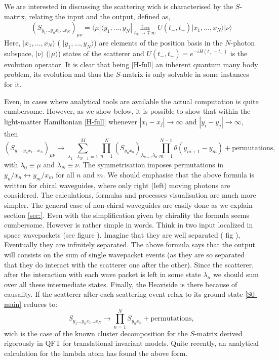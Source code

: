 \documentclass[notitlepage, prx, preprint, amsmath,superscriptaddress,amssymb]{revtex4-1}
\begin{document}
We are interested in discussing the scattering wich is characterised by the $S$-matrix, relating the input and the output, defined as,
\begin{equation}
( S_{y_1 ...y_n x_1...x_N} )_{\mu \nu} = \langle \mu | \langle y_1, ..., y_N | \lim_{t_\mp  \to \mp \infty} U(t_-, t_+) | x_1, ..., x_N \rangle | \nu \rangle
\end{equation}
Here, $|x_1, ...,x_N\rangle$ ( $|y_1, ...,y_N\rangle$)  are  elements of the position basis in the $N$-photon subspace,  $|\nu \rangle$  ($|\mu\rangle$)  states of the scatterer and $U (t_-, t_+) = e^{-i H (t_+-t_-)}$ is the evolution operator.  
It is clear that being \eqref{H-full} an inherent quantum many body problem, its evolution and thus the $S$-matrix is only solvable in some instances for it.  

Even, in cases where analytical tools are available the actual computation is quite cumbersome.  However, as we show below, it is possible to show that within the light-matter Hamiltonian \eqref{H-full} whenever $|x_i -x_j| \to \infty$ and $|y_i -y_j| \to \infty$, then
\begin{equation}
\label{S0-main}
( S_{y_1 ...y_n x_1...x_N} )_{\mu \nu} \to
\sum_{\lambda_1\dots \lambda_{N-1}=1}^M\prod_{n=1}^N (S_{y_nx_n})_{\lambda_{n-1}\lambda_n}
\prod_{m=1}^{N-1}\theta(y_{m+1}-y_m) + \text{permutations},
\end{equation}
with $\lambda_0\equiv \mu$ and $\lambda_N\equiv\nu$.  The symmetrisation imposes permutations in $y_n/x_n\leftrightarrow y_m/x_m$ for all $n$ and $m$.
We should emphasise that the above formula is written for chiral waveguides, where only right (left) moving photons are considered.  The calculations,  formulas  and processes visualisation are much more simpler.  The general case of non-chiral waveguides are easily done as we explain section \ref{sec:}.   Even with the simplification given by chirality the formula seems cumbersome.  However is rather simple in words.   Think in two input localized in space wavepackets (see figure ).  Imagine that they are well separated ( fig ), Eventually they are infinitely separated.  The above formula says that the output will consists on the sum of single wavepacket events (as they are so separated that they do interact with the scatterer one after the other).  Since the scatterer, after the interaction with each wave packet is left in some state $\lambda_n$ we should sum over all these intermediate states.  Finally, the Heaviside is there because of causality.   If the scatterer after each scattering event relax to its ground state  \eqref{S0-main} reduces to:
\begin{equation}
 S_{y_1 ...y_n x_1...x_N}  \to \prod_{n=1}^N S_{y_nx_n}
+ \text{permutations},
\end{equation}
wich is the case of the known cluster decomposition for the $S$-matrix derived rigorously in QFT for translational invariant models.  Quite recently, an analytical calculation for the lambda atom has found the above form.
\end{document}
